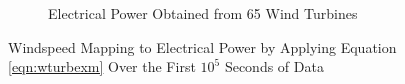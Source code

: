 \begin{figure}[t]
\begin{subfigure}{.5\textwidth}
  \caption{Electrical Power Obtained from 65 Wind Turbines}
  \label{fig:windpower}
\end{subfigure}
        \caption{Windspeed Mapping to Electrical Power by Applying Equation \ref{eqn:wturbexm} Over the First $10^5$ Seconds of Data}
\label{fig:speedpowermap}
\end{figure}
